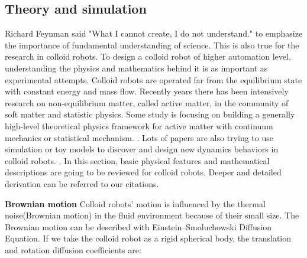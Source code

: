 \subsection{Theory and simulation}
Richard Feynman said "What I cannot create, I do not understand." to emphasize the importance of fundamental understanding of science. This is also true for the  research in colloid robots. To design a colloid robot of higher automation level, understanding the physics and mathematics behind it is as  important as  experimental attempts. Colloid robots are operated far from the equilibrium state with constant energy and mass flow. Recently years there has been intensively research on non-equilibrium matter, called active matter, in the community of soft matter and statistic physics. Some study is focusing on building a generally high-level theoretical physics framework for active matter with continuum mechanics or statistical mechanism. \cite{stenhammar2013continuum,solon2015pressure,fodor2016far}. Lots of papers are also trying to use simulation or toy models to discover and design new dynamics behaviors in colloid robots. \cite{bechinger2016active,speck2014effective,ten2011brownian}. In this section,  basic physical features and mathematical descriptions are going to be reviewed for colloid robots.  Deeper and detailed derivation can be referred to our citations.

\textbf{Brownian motion} Colloid robots' motion is influenced by the thermal noise(Brownian motion) in the fluid environment because of their small size. The Brownian motion can be described with Einstein–Smoluchowski Diffusion Equation.\cite{islam2004einstein} If we take the colloid robot as  a rigid spherical body, the translation and rotation diffusion coefficients are: 

